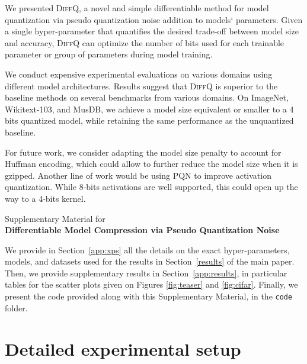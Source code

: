 \documentclass{article}
\newcommand{\diffq}{\textsc{DiffQ}\xspace}
\begin{document}
We presented \diffq, a novel and simple differentiable method for model quantization via pseudo quantization noise addition to models` parameters. Given a single hyper-parameter that quantifies the desired trade-off between model size and accuracy, \diffq can optimize the number of bits used for each trainable parameter or group of parameters during model training. 


We conduct expensive experimental evaluations on various domains using different model architectures. Results suggest that \diffq is superior to the baseline methods on several benchmarks from various domains. On ImageNet, Wikitext-103, and MusDB, we achieve a model size equivalent or smaller to a 4 bits quantized model, while retaining the same performance as the unquantized baseline.

For future work, we consider adapting the model size penalty to account for Huffman encoding, which could allow to further reduce the model size when it is gzipped. Another line of work would be using PQN to improve activation quantization. While 8-bits activations are well supported, this could open up the way to a 4-bits kernel. 
\clearpage




\renewcommand{\thesection}{\Alph{section}}
\onecolumn
\thispagestyle{empty}
\noindent\makebox[\linewidth]{\rule{\textwidth}{1pt}}
\begin{center}\Large {} Supplementary Material for \\
\textbf{Differentiable Model Compression via Pseudo Quantization Noise}
\noindent\makebox[\linewidth]{\rule{\textwidth}{1pt}}
\end{center}
\setcounter{section}{0}
\renewcommand\theHsection{\Alph{section}}

We provide in Section~\ref{app:xps} all the details on the 
exact hyper-parameters, models, and datasets used for the results in Section~\ref{results} of the main paper.
Then, we provide supplementary results in Section~\ref{app:results},
in particular tables for the scatter plots given on Figures \ref{fig:teaser} and \ref{fig:cifar}.
Finally, we present the code provided along with this Supplementary Material, in the \texttt{code} folder.

\vspace{-0.2cm}
\section{Detailed experimental setup}
\vspace{-0.1cm}
\label{app:xps}
\end{document}
